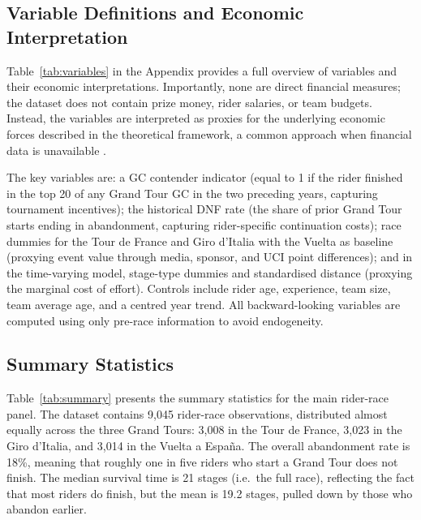 \subsection{Variable Definitions and Economic Interpretation}

Table~\ref{tab:variables} in the Appendix provides a full overview of variables and their economic interpretations. Importantly, none are direct financial measures; the dataset does not contain prize money, rider salaries, or team budgets. Instead, the variables are interpreted as proxies for the underlying economic forces described in the theoretical framework, a common approach when financial data is unavailable \parencite{kahn2000labormarket}.

The key variables are: a GC contender indicator (equal to 1 if the rider finished in the top 20 of any Grand Tour GC in the two preceding years, capturing tournament incentives); the historical DNF rate (the share of prior Grand Tour starts ending in abandonment, capturing rider-specific continuation costs); race dummies for the Tour de France and Giro d'Italia with the Vuelta as baseline (proxying event value through media, sponsor, and UCI point differences); and in the time-varying model, stage-type dummies and standardised distance (proxying the marginal cost of effort). Controls include rider age, experience, team size, team average age, and a centred year trend. All backward-looking variables are computed using only pre-race information to avoid endogeneity.

\subsection{Summary Statistics}

Table~\ref{tab:summary} presents the summary statistics for the main rider-race panel. The dataset contains 9{,}045 rider-race observations, distributed almost equally across the three Grand Tours: 3{,}008 in the Tour de France, 3{,}023 in the Giro d'Italia, and 3{,}014 in the Vuelta a Espa\~{n}a. The overall abandonment rate is 18\%, meaning that roughly one in five riders who start a Grand Tour does not finish. The median survival time is 21 stages (i.e.\ the full race), reflecting the fact that most riders do finish, but the mean is 19.2 stages, pulled down by those who abandon earlier.

